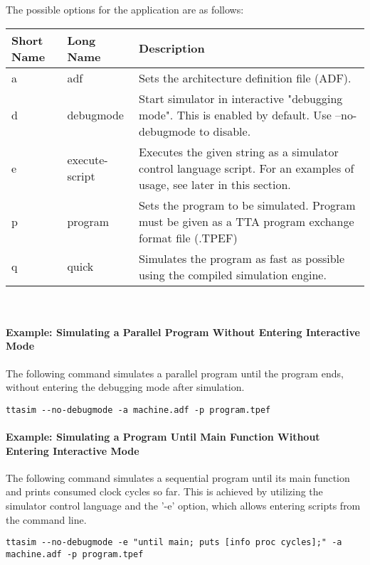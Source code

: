 \documentclass[twoside]{tceusermanual}
\begin{document}
The possible options for the application are as follows:\\

\begin{tabular}{p{}p{}
                p{}}
\textbf{Short Name} &\textbf{Long Name} &\textbf{Description} \\
\hline
a & adf & Sets the architecture definition file (ADF). \\
d & debugmode & Start simulator in interactive "debugging mode". This is enabled by default. Use --no-debugmode to disable.\\
e & execute-script & Executes the given string as a simulator control language script. For an examples of usage, see later in this section. \\
p & program & Sets the program to be simulated. Program must be given as a TTA program exchange format file (.TPEF) \\
q & quick & Simulates the program as fast as possible using the compiled simulation engine. \\
\end{tabular}\\



\paragraph{Example: Simulating a Parallel Program Without Entering Interactive
Mode}

The following command simulates a parallel program until the program ends,
without entering the debugging mode after simulation.

\begin{verbatim}
ttasim --no-debugmode -a machine.adf -p program.tpef
\end{verbatim}

\paragraph{Example: Simulating a Program Until Main Function Without
Entering Interactive Mode}

The following command simulates a sequential program until its main function and
prints consumed clock cycles so far. This is achieved by utilizing the simulator
control language and the '-e' option, which allows entering scripts 
from the command line.

\begin{verbatim}
ttasim --no-debugmode -e "until main; puts [info proc cycles];" -a machine.adf -p program.tpef
\end{verbatim}
\end{document}
